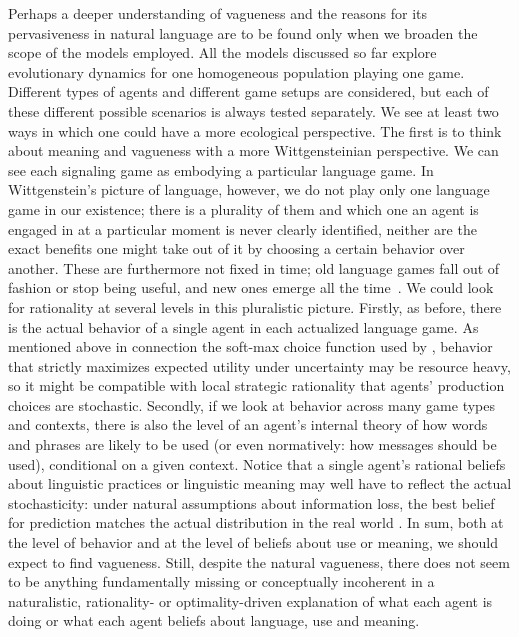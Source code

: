 \documentclass[a4paper]{article}
\newcommand{\mf}[1]{\textcolor{Red}{[mf: #1]}}
\begin{document}
Perhaps a deeper understanding of vagueness and the reasons for its pervasiveness in natural language are to be found only when we broaden the scope of the models employed.
All the models discussed so far explore evolutionary dynamics for one homogeneous population playing one game.
Different types of agents and different game setups are considered, but each of these different possible scenarios is always tested separately.
We see at least two ways in which one could have a more ecological perspective.
The first is to think about meaning and vagueness with a more Wittgensteinian perspective.
We can see each signaling game as embodying a particular language game.
In Wittgenstein's picture of language, however, we do not play only one language game in our existence; there is a plurality of them and which one an agent is engaged in at a particular moment is never clearly identified, neither are the exact benefits one might take out of it by choosing a certain behavior over another.
These are furthermore not fixed in time; old language games fall out of fashion or stop being useful, and new ones emerge all the time~\parencite[see][and in particular \S 23]{wittgenstein_philosophical_1953}.
We could look for rationality at several levels in this pluralistic picture.
Firstly, as before, there is the actual behavior of a single agent in each actualized language game.
As mentioned above in connection the soft-max choice function used by \textcite{franke_vagueness_2011}, behavior that strictly maximizes expected utility under uncertainty may be resource heavy, so it might be compatible with local strategic rationality that agents' production choices are stochastic.
Secondly, if we look at behavior across many game types and contexts, there is also the level of an agent's internal theory of how words and phrases are likely to be used (or even normatively: how messages should be used), conditional on a given context.
Notice that a single agent's rational beliefs about linguistic practices or linguistic meaning may well have to reflect the actual stochasticity: under natural assumptions about information loss, the best belief for prediction matches the actual distribution in the real world \parencite[\emph{e.g.}][]{VehtariOjanen2012:A-survey-of-Bay}.
In sum, both at the level of behavior and at the level of beliefs about use or meaning, we should expect to find vagueness.
Still, despite the natural vagueness, there does not seem to be anything fundamentally missing or conceptually incoherent in a naturalistic, rationality- or optimality-driven explanation of what each agent is doing or what each agent beliefs about language, use and meaning.
\end{document}
